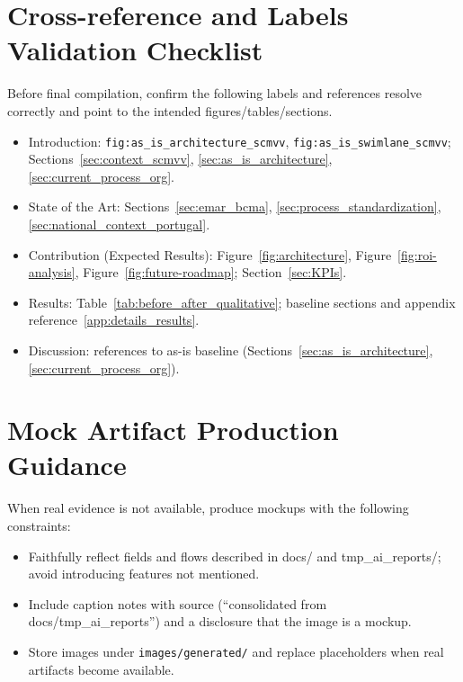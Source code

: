 \section{Cross-reference and Labels Validation Checklist}
Before final compilation, confirm the following labels and references resolve correctly and point to the intended figures/tables/sections.
\begin{itemize}
    \item Introduction: \texttt{fig:as\_is\_architecture\_scmvv}, \texttt{fig:as\_is\_swimlane\_scmvv}; Sections~\ref{sec:context_scmvv}, \ref{sec:as_is_architecture}, \ref{sec:current_process_org}.
    \item State of the Art: Sections~\ref{sec:emar_bcma}, \ref{sec:process_standardization}, \ref{sec:national_context_portugal}.
    \item Contribution (Expected Results): Figure~\ref{fig:architecture}, Figure~\ref{fig:roi-analysis}, Figure~\ref{fig:future-roadmap}; Section~\ref{sec:KPIs}.
    \item Results: Table~\ref{tab:before_after_qualitative}; baseline sections and appendix reference~\ref{app:details_results}.
    \item Discussion: references to as-is baseline (Sections~\ref{sec:as_is_architecture}, \ref{sec:current_process_org}).
\end{itemize}

\section{Mock Artifact Production Guidance}
When real evidence is not available, produce mockups with the following constraints:
\begin{itemize}
    \item Faithfully reflect fields and flows described in docs/ and tmp\_ai\_reports/; avoid introducing features not mentioned.
    \item Include caption notes with source (“consolidated from docs/tmp\_ai\_reports”) and a disclosure that the image is a mockup.
    \item Store images under \texttt{images/generated/} and replace placeholders when real artifacts become available.
\end{itemize}